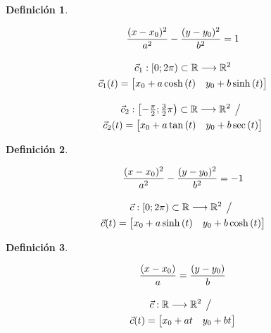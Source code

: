 \documentclass[a5paper,12pt,twoside]{book}
\newtheorem{defn}{{Definición}}[chapter]
\begin{document}
\begin{mdframed}[style=MyFrame1]
    \begin{defn}
    \end{defn}
    \begin{gather*}
        \dfrac{(x-x_0)^2}{a^2}-\dfrac{(y-y_0)^2}{b^2}=1
        \\[1em]
        \Vec{c}_1:[0;2 \pi) \subset \mathbb{R} \longrightarrow \mathbb{R}^2
        \\
        \Vec{c}_1(t) = \begin{bmatrix} x_0 + a\cosh{(t)} & y_0 + b\sinh{(t)} \end{bmatrix}
        \\[1em]
        \Vec{c}_2:\left[-\tfrac{\pi}{2}; \tfrac{3}{2} \pi\right) \subset \mathbb{R} \longrightarrow \mathbb{R}^2 \hspace{1ex} \big/ \hspace{1ex}
        \\
        \Vec{c}_2(t)= \begin{bmatrix} x_0 + a\tan{(t)} & y_0 + b\sec{(t)} \end{bmatrix}
    \end{gather*}
\end{mdframed}

\begin{mdframed}[style=MyFrame1]
    \begin{defn}
    \end{defn}
    \begin{gather*}
        \dfrac{(x-x_0)^2}{a^2}-\dfrac{(y-y_0)^2}{b^2}=-1
        \\[1em]
        \Vec{c}:[0;2 \pi) \subset \mathbb{R} \longrightarrow \mathbb{R}^2 \hspace{1ex} \big/ \hspace{1ex}
        \\
        \Vec{c}(t)= \begin{bmatrix} x_0 + a\sinh{(t)} & y_0 + b\cosh{(t)} \end{bmatrix}
    \end{gather*}
\end{mdframed}


\begin{mdframed}[style=MyFrame1]
    \begin{defn}
    \end{defn}
    \begin{gather*}
        \dfrac{(x-x_0)}{a}=\dfrac{(y-y_0)}{b}
        \\[1em]
        \Vec{c}: \mathbb{R} \longrightarrow \mathbb{R}^2 \hspace{1ex} \big/ \hspace{1ex}
        \\
        \Vec{c}(t) = \begin{bmatrix} x_0 + at & y_0 + bt \end{bmatrix}
    \end{gather*}
\end{mdframed}
\end{document}
